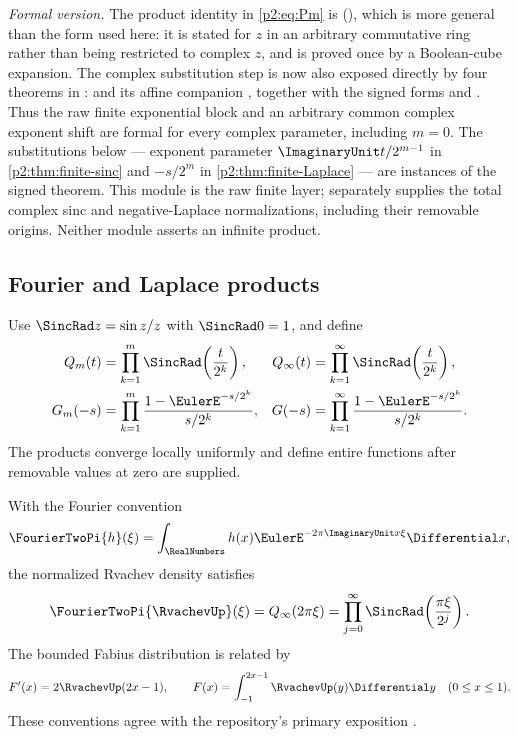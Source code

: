 \documentclass[11pt,oneside]{article}
\numberwithin{equation}{section}
\theoremstyle{definition}
\theoremstyle{remark}
\begin{document}
\emph{Formal version.}  The product identity in \eqref{p2:eq:Pm} is
 (),
which is more general than the form used here: it is stated for $z$ in an arbitrary
commutative ring rather than being restricted to complex $z$, and is proved once by a
Boolean-cube expansion.  The complex substitution step is now also exposed directly by four
theorems in :
 and its affine companion
, together with the signed forms
 and
.  Thus the raw finite exponential
block and an arbitrary common complex exponent shift are formal for every complex parameter,
including $m=0$.  The substitutions below --- exponent parameter
$\ImaginaryUnit t/2^{m-1}$ in \cref{p2:thm:finite-sinc} and $-s/2^m$ in
\cref{p2:thm:finite-Laplace} --- are instances of the signed theorem.  This module is the raw
finite layer;  separately supplies the total complex
sinc and negative-Laplace normalizations, including their removable origins.  Neither module
asserts an infinite product.

\subsection{Fourier and Laplace products}

Use $\SincRad z=\sin z/z$ with $\SincRad0=1$, and define
\begin{align}
 Q_m(t)&=\prod_{k=1}^{m}\SincRad\!\left(\frac{t}{2^k}\right),
 &Q_\infty(t)&=\prod_{k=1}^{\infty}\SincRad\!\left(\frac{t}{2^k}\right),
 \label{p2:eq:Qdef}\\
 G_m(-s)&=\prod_{k=1}^{m}\frac{1-\EulerE^{-s/2^k}}{s/2^k},
 &G(-s)&=\prod_{k=1}^{\infty}\frac{1-\EulerE^{-s/2^k}}{s/2^k}.
 \label{p2:eq:Gdef}
\end{align}
The products converge locally uniformly and define entire functions after removable values
at zero are supplied.

With the Fourier convention
\[
 \FourierTwoPi{h}(\xi)=\int_{\RealNumbers}h(x)\EulerE^{-2\pi\ImaginaryUnit x\xi}\Differential x,
\]
the normalized Rvachev density satisfies
\begin{equation}
 \FourierTwoPi{\RvachevUp}(\xi)=Q_\infty(2\pi\xi)
 =\prod_{j=0}^{\infty}\SincRad\!\left(\frac{\pi\xi}{2^j}\right).
 \label{p2:eq:upFourier}
\end{equation}
The bounded Fabius distribution is related by
\begin{equation}
 F'(x)=2\RvachevUp(2x-1),\qquad
 F(x)=\int_{-1}^{2x-1}\RvachevUp(y)\Differential y\quad(0\le x\le1).
 \label{p2:eq:Fup}
\end{equation}
These conventions agree with the repository's primary exposition
\cite{p2:proveit-primary,p2:arias1982}.
\end{document}
